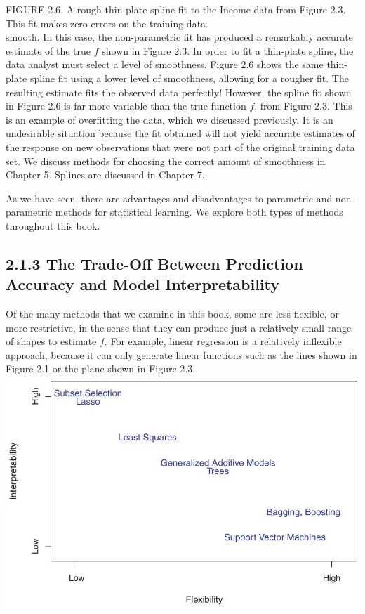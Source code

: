 \documentclass[10pt]{article}
\begin{document}
FIGURE 2.6. A rough thin-plate spline fit to the Income data from Figure 2.3. This fit makes zero errors on the training data.\\
smooth. In this case, the non-parametric fit has produced a remarkably accurate estimate of the true $f$ shown in Figure 2.3. In order to fit a thin-plate spline, the data analyst must select a level of smoothness. Figure 2.6 shows the same thin-plate spline fit using a lower level of smoothness, allowing for a rougher fit. The resulting estimate fits the observed data perfectly! However, the spline fit shown in Figure 2.6 is far more variable than the true function $f$, from Figure 2.3. This is an example of overfitting the data, which we discussed previously. It is an undesirable situation because the fit obtained will not yield accurate estimates of the response on new observations that were not part of the original training data set. We discuss methods for choosing the correct amount of smoothness in Chapter 5. Splines are discussed in Chapter 7.

As we have seen, there are advantages and disadvantages to parametric and non-parametric methods for statistical learning. We explore both types of methods throughout this book.

\subsection*{2.1.3 The Trade-Off Between Prediction Accuracy and Model Interpretability}
Of the many methods that we examine in this book, some are less flexible, or more restrictive, in the sense that they can produce just a relatively small range of shapes to estimate $f$. For example, linear regression is a relatively inflexible approach, because it can only generate linear functions such as the lines shown in Figure 2.1 or the plane shown in Figure 2.3.\\
\includegraphics[max width=\textwidth, center]{2025_05_05_efe77898333945044de4g-040}
\end{document}
